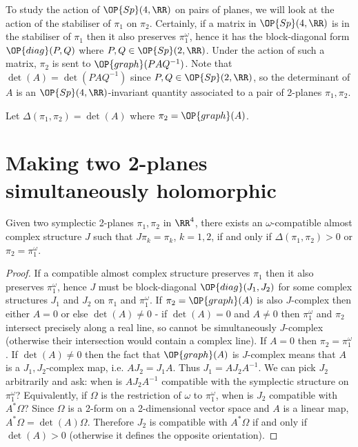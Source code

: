 To study the action of $\OP{Sp}(4,\RR)$ on pairs of planes, we will look at the action of the stabiliser of $\pi_1$ on $\pi_2$. Certainly, if a matrix in $\OP{Sp}(4,\RR)$ is in the stabiliser of $\pi_1$ then it also preserves $\pi_1^{\omega}$, hence it has the block-diagonal form $\OP{diag}(P,Q)$ where $P,Q\in\OP{Sp}(2,\RR)$. Under the action of such a matrix, $\pi_2$ is sent to $\OP{graph}(PAQ^{-1})$. Note that $\det(A)=\det(PAQ^{-1})$ since $P,Q\in\OP{Sp}(2,\RR)$, so the determinant of $A$ is an $\OP{Sp}(4,\RR)$-invariant quantity associated to a pair of 2-planes $\pi_1,\pi_2$.

\begin{Definition}
  Let $\Delta(\pi_1,\pi_2)=\det(A)$ where $\pi_2=\OP{graph}(A)$.
\end{Definition}

\section{Making two 2-planes simultaneously holomorphic}

\begin{Lemma}
  Given two symplectic 2-planes $\pi_1,\pi_2$ in $\RR^4$, there exists an $\omega$-compatible almost complex structure $J$ such that $J\pi_k=\pi_k$, $k=1,2$, if and only if $\Delta(\pi_1,\pi_2)>0$ or $\pi_2=\pi_1^{\omega}$.
\end{Lemma}
\begin{proof}
  If a compatible almost complex structure preserves $\pi_1$ then it also preserves $\pi_1^{\omega}$, hence $J$ must be block-diagonal $\OP{diag}(J_1,J_2)$ for some complex structures $J_1$ and $J_2$ on $\pi_1$ and $\pi_1^{\omega}$. If $\pi_2=\OP{graph}(A)$ is also $J$-complex then either $A=0$ or else $\det(A)\neq 0$ - if $\det(A)=0$ and $A\neq 0$ then $\pi_1^{\omega}$ and $\pi_2$ intersect precisely along a real line, so cannot be simultaneously $J$-complex (otherwise their intersection would contain a complex line). If $A=0$ then $\pi_2=\pi_1^{\omega}$. If $\det(A)\neq 0$ then the fact that $\OP{graph}(A)$ is $J$-complex means that $A$ is a $J_1,J_2$-complex map, i.e. $AJ_2=J_1A$. Thus $J_1=AJ_2A^{-1}$. We can pick $J_2$ arbitrarily and ask: when is $AJ_2A^{-1}$ compatible with the symplectic structure on $\pi_1^{\omega}$? Equivalently, if $\Omega$ is the restriction of $\omega$ to $\pi_1^{\omega}$, when is $J_2$ compatible with $A^*\Omega$? Since $\Omega$ is a 2-form on a 2-dimensional vector space and $A$ is a linear map, $A^*\Omega=\det(A)\Omega$. Therefore $J_2$ is compatible with $A^*\Omega$ if and only if $\det(A)>0$ (otherwise it defines the opposite orientation).
\end{proof}


